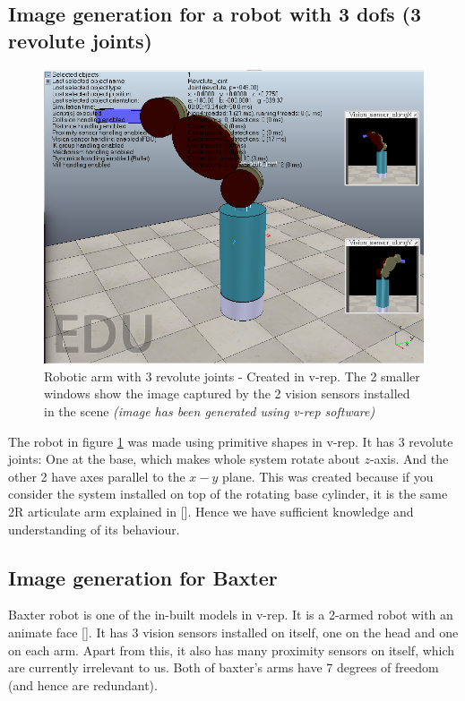 \documentclass[12pt]{article}
\begin{document}
\subsection{Image generation for a robot with 3 dofs (3 revolute joints)}

\begin{figure}[h]
  \includegraphics[width=\columnwidth]{3dof}
  \caption{Robotic arm with 3 revolute joints - Created in v-rep. The 2 smaller windows show the image captured by the 2 vision sensors installed in the scene \textit{\small{(image has been generated using v-rep software)}}}
  \label{3dof}
\end{figure}
The robot in figure \ref{3dof} was made using primitive shapes in v-rep.
It has 3 revolute joints:
One at the base, which makes whole system rotate about $z$-axis. And the other 2 have axes parallel to the $x-y$ plane.
This was created because if you consider the system installed on top of the rotating base cylinder, it is the same 2R articulate arm explained in [\cite{deb}]. Hence we have sufficient knowledge and understanding of its behaviour.

\subsection{Image generation for Baxter}
Baxter robot is one of the in-built models in v-rep.
It is a 2-armed robot with an animate face [\cite{wiki_Baxter}].
It has 3 vision sensors installed on itself, one on the head and one on each arm. Apart from this, it also has many proximity sensors on itself, which are currently irrelevant to us.
Both of baxter's arms have 7 degrees of freedom (and hence are redundant).
\end{document}
